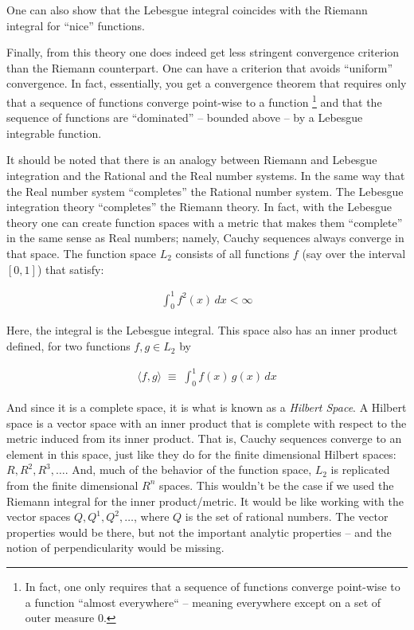 \documentclass{article}
\begin{document}
One can also show that the Lebesgue integral coincides with the Riemann integral 
for ``nice'' functions.

Finally, from this theory one does indeed get less stringent convergence 
criterion than the Riemann counterpart. One can have a criterion that avoids ``uniform'' convergence.
In fact, essentially, you get a convergence theorem that requires only that a sequence
of functions converge point-wise to a function%
\footnote{In fact, one only requires that a sequence of functions converge point-wise 
to a function ``almost everywhere`` -- meaning everywhere except on a set of outer measure $0$.}
and that the sequence of functions 
are ``dominated'' -- bounded above -- by a Lebesgue integrable function.

It should be noted that there is an analogy between Riemann and Lebesgue integration 
and the Rational and the Real number systems. In the same way that the Real number 
system ``completes'' the Rational number system. The Lebesgue integration theory ``completes''
the Riemann theory. In fact, with the Lebesgue theory one can create function 
spaces with a metric that makes them ``complete'' in the same sense as Real 
numbers; namely, Cauchy sequences always converge in that space. 
The function space $L_2$ consists of
all functions $f$ (say over the interval $[0,1]$) that satisfy:

\begin{eqnarray}
\int_0^1 f^2(x) \, dx < \infty
\end{eqnarray}

Here, the integral is the Lebesgue integral. This space also has an inner 
product defined, for two functions $f, g \in L_2$ by

\begin{eqnarray}
\langle f, g \rangle \; \equiv \; \int_0^1 f(x)\, g(x)\, dx
\end{eqnarray}

And since it is a complete space, it is what is known as a {\em Hilbert Space\/}.
A Hilbert space is a vector space with an inner product that is complete with 
respect to the metric induced from its inner product. 
That is, Cauchy sequences converge to an element in this
space, just like they do for the finite dimensional Hilbert spaces: $R, R^2, R^3, \ldots$.
And, much of the behavior of the function space, $L_2$ is replicated from 
the finite dimensional $R^n$ spaces. This wouldn't be the case if we used
the Riemann integral for the inner product/metric. It would be like
working with the vector spaces $Q, Q^1, Q^2, \ldots$, where $Q$ is the set 
of rational numbers. The vector properties would be there, but not 
the important analytic properties -- and the notion of perpendicularity would
be missing.
\end{document}
